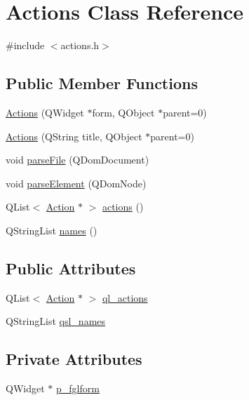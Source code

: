 \hypertarget{classActions}{
\section{Actions Class Reference}
\label{classActions}
}


{\ttfamily \#include $<$actions.h$>$}

\subsection*{Public Member Functions}
\begin{DoxyCompactItemize}
\item 
\hyperlink{classActions_ac67e8c16bb09fef5bb0babde13f044d4}{Actions} (QWidget $\ast$form, QObject $\ast$parent=0)
\item 
\hyperlink{classActions_a5b05cd9ca4e4bb6f75e11f0e87673d4d}{Actions} (QString title, QObject $\ast$parent=0)
\item 
void \hyperlink{classActions_a9f8ba63a37f428b3cf38d7fc66300e1a}{parseFile} (QDomDocument)
\item 
void \hyperlink{classActions_a3bdb0b11ee3cae83ee5fc642493c3043}{parseElement} (QDomNode)
\item 
QList$<$ \hyperlink{classAction}{Action} $\ast$ $>$ \hyperlink{classActions_ad2a312ace21d32a4cb41dd65c9dba6a5}{actions} ()
\item 
QStringList \hyperlink{classActions_a6050208547b42100cd2436d7c3136796}{names} ()
\end{DoxyCompactItemize}
\subsection*{Public Attributes}
\begin{DoxyCompactItemize}
\item 
QList$<$ \hyperlink{classAction}{Action} $\ast$ $>$ \hyperlink{classActions_a203248bdd5f4dd6c480f88e58ac80fcc}{ql\_\-actions}
\item 
QStringList \hyperlink{classActions_a863664ecad15bff8c6968ec9ecc17a4a}{qsl\_\-names}
\end{DoxyCompactItemize}
\subsection*{Private Attributes}
\begin{DoxyCompactItemize}
\item 
QWidget $\ast$ \hyperlink{classActions_accd87f3514bfe9be6ba9c83550aa1e24}{p\_\-fglform}
\end{DoxyCompactItemize}


